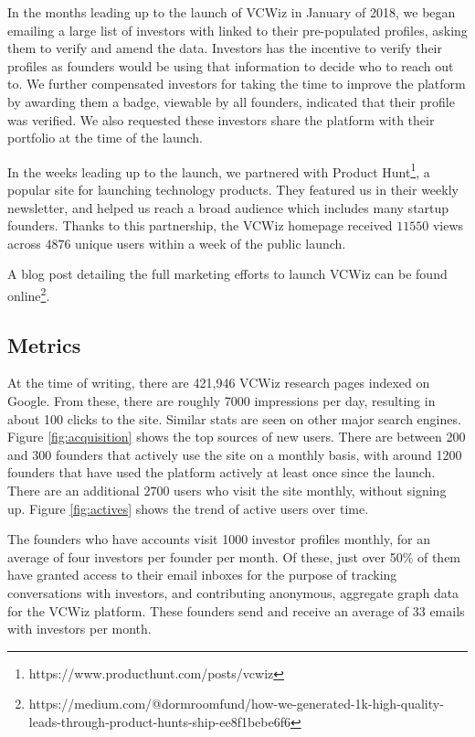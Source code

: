 In the months leading up to the launch of VCWiz in January of 2018, we began emailing a large list of investors with linked to their pre-populated profiles, asking them to verify and amend the data. Investors has the incentive to verify their profiles as founders would be using that information to decide who to reach out to. We further compensated investors for taking the time to improve the platform by awarding them a badge, viewable by all founders, indicated that their profile was verified. We also requested these investors share the platform with their portfolio at the time of the launch.

In the weeks leading up to the launch, we partnered with Product Hunt\footnote{https://www.producthunt.com/posts/vcwiz}, a popular site for launching technology products. They featured us in their weekly newsletter, and helped us reach a broad audience which includes many startup founders. Thanks to this partnership, the VCWiz homepage received $11550$ views across $4876$ unique users within a week of the public launch.

A blog post detailing the full marketing efforts to launch VCWiz can be found online\footnote{https://medium.com/@dormroomfund/how-we-generated-1k-high-quality-leads-through-product-hunts-ship-ee8f1bebe6f6}.

\subsection{Metrics}

At the time of writing, there are 421,946 VCWiz research pages indexed on Google. From these, there are roughly 7000 impressions per day, resulting in about 100 clicks to the site. Similar stats are seen on other major search engines. Figure \ref{fig:acquisition} shows the top sources of new users. There are between 200 and 300 founders that actively use the site on a monthly basis, with around 1200 founders that have used the platform actively at least once since the launch. There are an additional $2700$ users who visit the site monthly, without signing up. Figure \ref{fig:actives} shows the trend of active users over time.

The founders who have accounts visit 1000 investor profiles monthly, for an average of four investors per founder per month. Of these, just over 50\% of them have granted access to their email inboxes for the purpose of tracking conversations with investors, and contributing anonymous, aggregate graph data for the VCWiz platform. These founders send and receive an average of 33 emails with investors per month.

